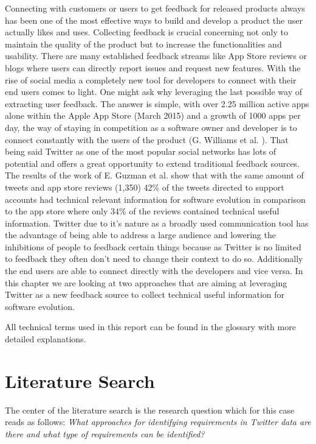 \documentclass[a4paper,10pt, bibliography=totocnumbered]{scrreprt}
\begin{document}
Connecting with customers or users to get feedback for released products always has been one of the most effective ways to build and develop a product the user actually likes and uses. Collecting feedback is crucial concerning not only to maintain the quality of the product but to increase the functionalities and usability. There are many established feedback streams like App Store reviews or blogs where users can directly report issues and request new features. 
With the rise of social media a completely new tool for developers to connect with their end users comes to light. One might ask why leveraging the last possible way of extracting user feedback. The answer is simple, with over 2.25 million active apps alone within the Apple App Store (March 2015) and a growth of 1000 apps per day, the way of staying in competition as a software owner and developer is to connect constantly with the users of the product (G. Williams et al. \cite{Williams}). That being said Twitter as one of the most popular social networks has lots of potential and offers a great opportunity to extend traditional feedback sources. The results of the work of E. Guzman et al. \cite{Guzman} show that with the same amount of tweets and app store reviews (1,350) 42\% of the tweets directed to support accounts had technical relevant information for software evolution in comparison to the app store where only 34\% of the reviews contained technical useful information. Twitter due to it's nature as a broadly used communication tool has the advantage of being able to address a large audience and lowering the inhibitions of people to feedback certain things because as Twitter is no limited to feedback they often don't need to change their context to do so. Additionally the end users are able to connect directly with the developers and vice versa.
In this chapter we are looking at two approaches that are aiming at leveraging Twitter as a new feedback source to collect technical useful information for software evolution.

All technical terms used in this report can be found in the glossary with more detailed explanations.


\chapter{Literature Search}
\label{chap:2}

The center of the literature search is the research question which for this case reads as follows:
\textit{What approaches for identifying requirements in Twitter data are there and what type of requirements can be identified?}
\end{document}
